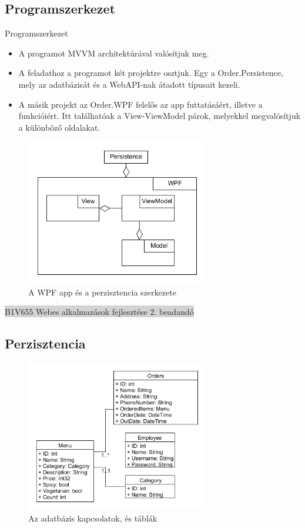 \documentclass[11pt,a4paper]{article}
\begin{document}
\subsection{Programszerkezet}Programszerkezet
\begin{itemize}
	\item A programot MVVM architektúrával valósítjuk meg.
	\item A feladathoz a programot két projektre osztjuk. Egy a Order.Persistence, mely
	az adatbázisát és a WebAPI-nak átadott típusait kezeli.
	\item A másik projekt az Order.WPF felelős az app futtatásáért, illetve a funkcióiért.
	Itt találhatóak a View-ViewModel párok, melyekkel megvalósítjuk a különböző oldalakat.
\end{itemize}
\begin{figure}[h]
	\centering
		\includegraphics[width=8cm]{uml/WpfBase.png}
	\caption{A WPF app és a perzisztencia szerkezete}
\end{figure}
\newpage
\thispagestyle{empty}
\begin{center}
	\colorbox{lightgray}{{\large B1V655} \hspace{3cm} {\large Webes alkalmazások fejlesztése 2. beadandó} \hspace{5cm} \thepage}
\end{center}

\subsection{Perzisztencia} 
\begin{figure}[h]
	\centering
	\includegraphics[width=8cm]{uml/Database.png}
	\caption{Az adatbázis kapcsolatok, és táblák}
\end{figure}
\end{document}
